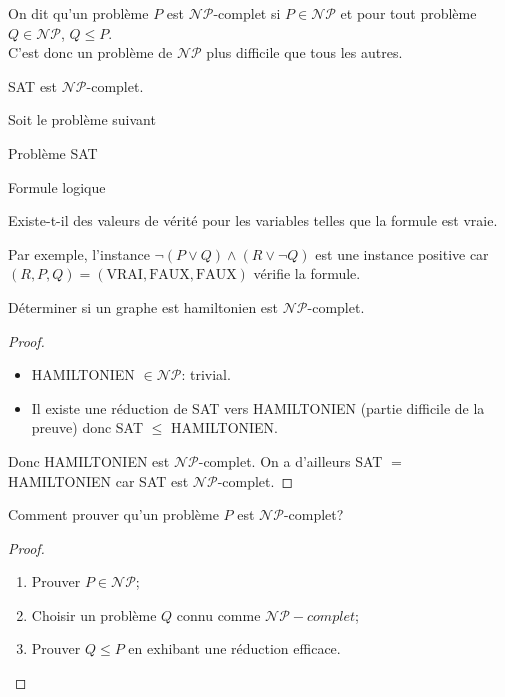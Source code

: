 \begin{mydef}
  On dit qu'un problème $P$ est $\mathcal{NP}$-complet si $P \in \mathcal{NP}$ et pour tout problème $Q \in \mathcal{NP}$, $Q \leq P$.\\
  C'est donc un problème de $\mathcal{NP}$ plus difficile que tous les autres.
\end{mydef}

\begin{mytheo} [Cook]
  SAT est $\mathcal{NP}$-complet.
\end{mytheo}

\begin{myexem}
  Soit le problème suivant
  \begin{description}
    \item{Problème} SAT
    \item[Instance] Formule logique
    \item[Question] Existe-t-il des valeurs de vérité pour les variables telles que la formule est vraie.
  \end{description}
  Par exemple, l'instance $\lnot(P \lor Q) \land (R \lor \lnot Q)$ est une instance positive car
  $(R, P, Q) = (\text{VRAI}, \text{FAUX}, \text{FAUX})$ vérifie la formule.
\end{myexem}

\begin{mytheo} [Karp]
  Déterminer si un graphe est hamiltonien est $\mathcal{NP}$-complet.
  \begin{proof}\hfill
    \begin{itemize}
      \item HAMILTONIEN $\in \mathcal{NP}$: trivial.
      \item Il existe une réduction de SAT vers HAMILTONIEN (partie difficile de la preuve) donc
        SAT $\leq$ HAMILTONIEN.
    \end{itemize}
    Donc HAMILTONIEN est $\mathcal{NP}$-complet.
    On a d'ailleurs SAT $=$ HAMILTONIEN car SAT est $\mathcal{NP}$-complet.
  \end{proof}
\end{mytheo}

\begin{mytheo}
Comment prouver qu'un problème $P$ est $\mathcal{NP}$-complet?
\begin{proof}\hfill
  \begin{enumerate}
    \item Prouver $P \in \mathcal{NP}$;
    \item Choisir un problème $Q$ connu comme $\mathcal{NP}-complet$;
    \item Prouver $Q \leq P$ en exhibant une réduction efficace.
  \end{enumerate}
  \end{proof}
\end{mytheo}

